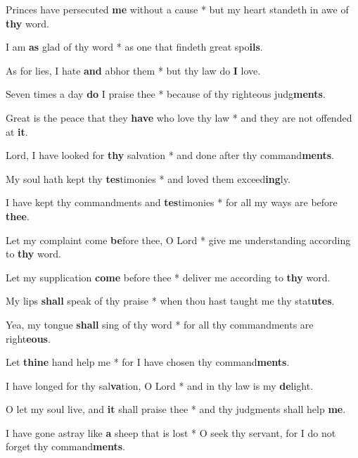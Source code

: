 \begin{multicols}{2}
	Princes have persecuted \textbf{me} without a cause * but my heart standeth in awe of \textbf{thy} word.
	
	I am \textbf{as} glad of thy word * as one that findeth great spo\textbf{ils}.
	
	As for lies, I hate \textbf{and} abhor them * but thy law do \textbf{I} love.
	
	Seven times a day \textbf{do} I praise thee * because of thy righteous judg\textbf{ments}.
	
	Great is the peace that they \textbf{have} who love thy law * and they are not offended at \textbf{it}.
	
	Lord, I have looked for \textbf{thy} salvation * and done after thy command\textbf{ments}.
	
	My soul hath kept thy \textbf{tes}timonies * and loved them exceed\textbf{ing}ly.
	
	I have kept thy commandments and \textbf{tes}timonies * for all my ways are before \textbf{thee}.
	
	Let my complaint come \textbf{be}fore thee, O Lord * give me understanding according to \textbf{thy} word.
	
	Let my supplication \textbf{come} before thee * deliver me according to \textbf{thy} word.
	
	My lips \textbf{shall} speak of thy praise * when thou hast taught me thy stat\textbf{utes}.
	
	Yea, my tongue \textbf{shall} sing of thy word * for all thy commandments are right\textbf{eous}.
	
	Let \textbf{thine} hand help me * for I have chosen thy command\textbf{ments}.
	
	I have longed for thy sal\textbf{va}tion, O Lord * and in thy law is my \textbf{de}light.
	
	O let my soul live, and \textbf{it} shall praise thee * and thy judgments shall help \textbf{me}.
	
	I have gone astray like \textbf{a} sheep that is lost * O seek thy servant, for I do not forget thy command\textbf{ments}.
\end{multicols}